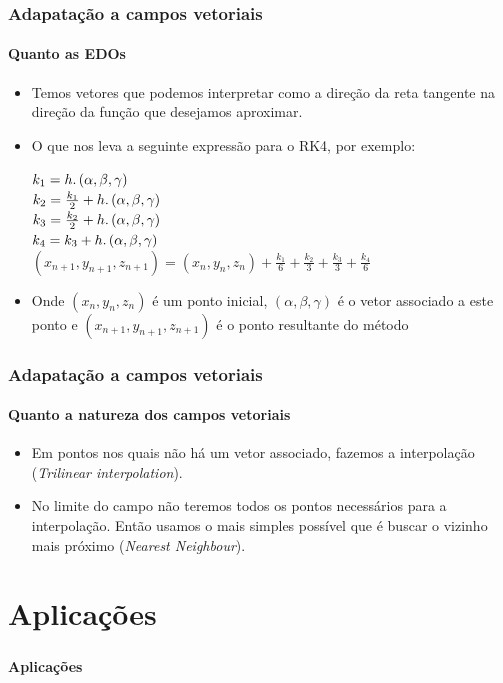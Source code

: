 \documentclass[brazil, 10pt]{beamer}
\begin{document}
\begin{frame}
  \frametitle{Adapatação a campos vetoriais}
  \framesubtitle{Quanto as EDOs}
  
  \begin{itemize}
    \item Temos vetores que podemos interpretar como a direção da reta tangente na direção da função que desejamos aproximar.
    \item O que nos leva a seguinte expressão para o RK4, por exemplo:

    $k_{1} = h\ldotp (\alpha ,\beta ,\gamma)$\\
    $k_{2} = \frac{k_{1}}{2} + h\ldotp (\alpha ,\beta ,\gamma)$\\
    $k_{3} = \frac{k_{2}}{2} + h\ldotp (\alpha ,\beta ,\gamma)$\\
    $k_{4} = k_{3} + h\ldotp (\alpha ,\beta ,\gamma )$\\
    $(x_{n+1}, y_{n+1}, z_{n+1}) = (x_{n}, y_{n}, z_{n}) + \frac{k_{1}}{6} + \frac{k_{2}}{3} + \frac{k_{3}}{3} + \frac{k_{4}}{6}$
    
    \item Onde $ (x_{n}, y_{n}, z_{n}) $ é um ponto inicial, $(\alpha ,\beta ,\gamma)$ é o vetor associado a este ponto e $ (x_{n+1}, y_{n+1}, z_{n+1}) $ é o ponto resultante do método
  \end{itemize}


\end{frame}

\begin{frame}
  \frametitle{Adapatação a campos vetoriais}
  \framesubtitle{Quanto a natureza dos campos vetoriais}

  \begin{itemize}
    \item Em pontos nos quais não há um vetor associado, fazemos a interpolação (\textit{Trilinear interpolation}).
    \item No limite do campo não teremos todos os pontos necessários para a interpolação. Então usamos o mais simples possível que é buscar o vizinho mais próximo (\textit{Nearest Neighbour}).
  \end{itemize}
\end{frame}

\section{Aplicações}
\begin{frame}
  \frametitle{}
  \framesubtitle{}
  \begin{Large}
  \begin{center}
  \textbf{Aplicações}
  \end{center}
  \end{Large}
\end{frame}
\end{document}
